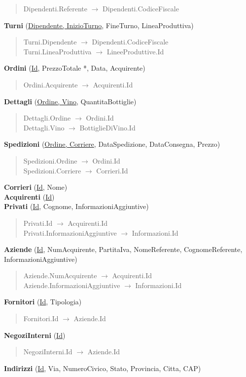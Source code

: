 \begin{verse}
	Dipendenti.Referente $\to$ Dipendenti.CodiceFiscale
\end{verse}
\textbf{Turni} (\underline{Dipendente, InizioTurno}, FineTurno, LineaProduttiva)
\begin{verse}
	Turni.Dipendente $\to$ Dipendenti.CodiceFiscale\\
	Turni.LineaProduttiva $\to$ LineeProduttive.Id
\end{verse}
\textbf{Ordini} (\underline{Id}, PrezzoTotale *, Data, Acquirente)
\begin{verse}
	Ordini.Acquirente $\to$ Acquirenti.Id
\end{verse}
\textbf{Dettagli} (\underline{Ordine, Vino}, QuantitaBottiglie)
\begin{verse}
	Dettagli.Ordine $\to$ Ordini.Id\\
	Dettagli.Vino $\to$ BottiglieDiVino.Id
\end{verse}
\textbf{Spedizioni} (\underline{Ordine, Corriere}, DataSpedizione, DataConsegna, Prezzo)
\begin{verse}
	Spedizioni.Ordine $\to$ Ordini.Id\\
	Spedizioni.Corriere $\to$ Corrieri.Id
\end{verse}
\textbf{Corrieri} (\underline{Id}, Nome)\\
\textbf{Acquirenti} (\underline{Id})\\
\textbf{Privati} (\underline{Id}, Cognome, InformazioniAggiuntive)
\begin{verse}
	Privati.Id $\to$ Acquirenti.Id\\
	Privati.InformazioniAggiuntive $\to$ Informazioni.Id
\end{verse}
\textbf{Aziende} (\underline{Id}, NumAcquirente, PartitaIva, NomeReferente, CognomeReferente, InformazioniAggiuntive)
\begin{verse}
	Aziende.NumAcquirente $\to$ Acquirenti.Id\\
	Aziende.InformazioniAggiuntive $\to$ Informazioni.Id
\end{verse}
\textbf{Fornitori} (\underline{Id}, Tipologia)
\begin{verse}
	Fornitori.Id $\to$ Aziende.Id
\end{verse}
\textbf{NegoziInterni} (\underline{Id})
\begin{verse}
	NegoziInterni.Id $\to$ Aziende.Id
\end{verse}
\textbf{Indirizzi} (\underline{Id}, Via, NumeroCivico, Stato, Provincia, Citta, CAP)\\
